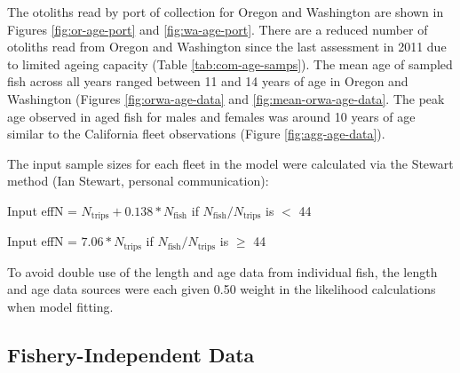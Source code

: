 \documentclass[11pt,
  english,
  a4paper,
]{article}
\begin{document}

The otoliths read by port of collection for Oregon and Washington are shown in Figures \ref{fig:or-age-port} and \ref{fig:wa-age-port}. There are a reduced number of otoliths read from Oregon and Washington since the last assessment in 2011 due to limited ageing capacity (Table \ref{tab:com-age-samps}). The mean age of sampled fish across all years ranged between 11 and 14 years of age in Oregon and Washington (Figures \ref{fig:orwa-age-data} and \ref{fig:mean-orwa-age-data}. The peak age observed in aged fish for males and females was around 10 years of age similar to the California fleet observations (Figure \ref{fig:agg-age-data}).

\leavevmode\tagmcend\tagstructend\par


The input sample sizes for each fleet in the model were calculated via the Stewart method (Ian Stewart, personal communication):

\leavevmode\tagmcend\tagstructend\par

\begin{centering}

Input effN = $N_{\text{trips}} + 0.138 * N_{\text{fish}}$ if $N_{\text{fish}}/N_{\text{trips}}$ is $<$ 44

Input effN = $7.06 * N_{\text{trips}}$ if $N_{\text{fish}}/N_{\text{trips}}$ is $\geq$ 44

\end{centering}


To avoid double use of the length and age data from individual fish, the length and age data sources were each given 0.50 weight in the likelihood calculations when model fitting.

\leavevmode\tagmcend\tagstructend\par


\hypertarget{fishery-independent-data}{%
\subsection{Fishery-Independent Data}\label{fishery-independent-data}}

\leavevmode\tagmcend\tagstructend
\end{document}
